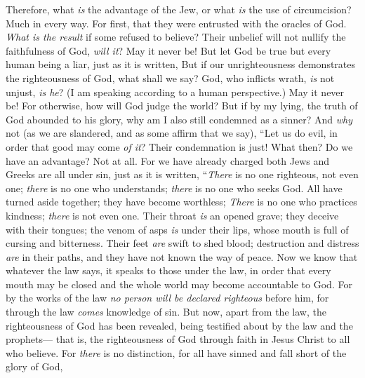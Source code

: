 \begin{biblechapter} %
 Therefore, what \textit{is} the advantage of the Jew, or what \textit{is} the use of circumcision?
\verse Much in every way. For first, that they were entrusted with the oracles of God.
\verse \textit{What is the result} if some refused to believe? Their unbelief will not nullify the faithfulness of God, \textit{will it}?
\verse May it never be! But let God be true but every human being a liar, just as it is written,
\verse But if our unrighteousness demonstrates the righteousness of God, what shall we say? God, who inflicts wrath, \textit{is} not unjust, \textit{is he}? (I am speaking according to a human perspective.)
\verse May it never be! For otherwise, how will God judge the world?
\verse But if by my lying, the truth of God abounded to his glory, why am I also still condemned as a sinner?
\verse And \textit{why} not (as we are slandered, and as some affirm that we say), “Let us do evil, in order that good may come \textit{of it}? Their condemnation is just!
 What then? Do we have an advantage? Not at all. For we have already charged both Jews and Greeks are all under sin,
\verse just as it is written,
\verse “\textit{There} is no one righteous, not even one;
\verse \textit{there} is no one who understands; 
\textit{there} is no one who seeks God.
\verse All have turned aside together; they have become worthless; 
\textit{There} is no one who practices kindness; 
\textit{there} is not even one.
\verse Their throat \textit{is} an opened grave; 
they deceive with their tongues; 
the venom of asps \textit{is} under their lips,
\verse whose mouth is full of cursing and bitterness.
\verse Their feet \textit{are} swift to shed blood;
\verse destruction and distress \textit{are} in their paths,
\verse and they have not known the way of peace.
\verse Now we know that whatever the law says, it speaks to those under the law, in order that every mouth may be closed and the whole world may become accountable to God.
\verse For by the works of the law \textit{no person will be declared righteous} before him, for through the law \textit{comes} knowledge of sin.
 But now, apart from the law, the righteousness of God has been revealed, being testified about by the law and the prophets—
\verse that is, the righteousness of God through faith in Jesus Christ to all who believe. For \textit{there} is no distinction,
\verse for all have sinned and fall short of the glory of God,

\end{biblechapter}
